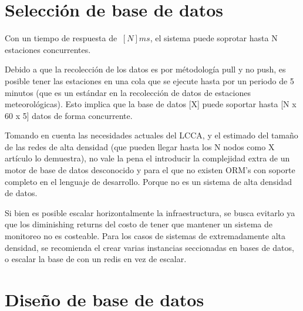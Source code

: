 
\section{Selección de base de datos}


Con un tiempo de respuesta de $~[N]ms$, el sistema puede soprotar hasta N estaciones concurrentes.

Debido a que la recolección de los datos es por métodología pull y no push, es posible tener las estaciones en una cola que se ejecute hasta por un periodo de 5 minutos (que es un estándar en la recolección de datos de estaciones meteorológicas). Esto implica que la base de datos [X] puede soportar hasta [N x 60 x 5] datos de forma concurrente.

Tomando en cuenta las necesidades actuales del LCCA, y el estimado del tamaño de las redes de alta densidad (que pueden llegar hasta los N nodos como X artículo lo demuestra), no vale la pena el introducir la complejidad extra de un motor de base de datos desconocido y para el que no existen ORM's con soporte completo en el lenguaje de desarrollo. Porque no es un sistema de alta densidad de datos.

Si bien es posible escalar horizontalmente la infraestructura, se busca evitarlo ya que los diminishing returns del costo de tener que mantener un sistema de monitoreo no es costeable. Para los casos de sistemas de extremadamente alta densidad, se recomienda el crear varias instancias seccionadas en bases de datos, o escalar la base de con un redis en vez de escalar.



\section{Diseño de base de datos}

